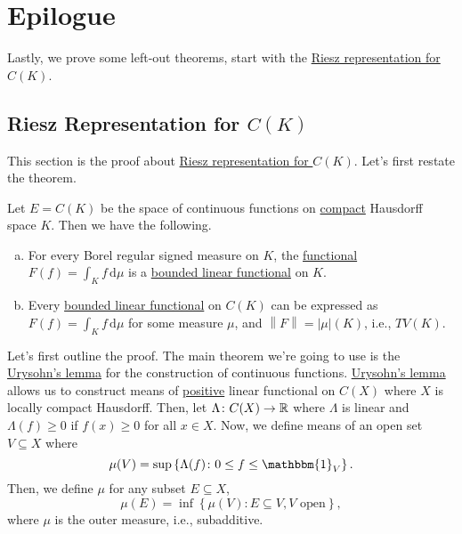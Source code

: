 \chapter{Epilogue}
Lastly, we prove some left-out theorems, start with the \hyperref[thm:Riesz-representation-for-C-K]{Riesz representation for \(C(K)\)}.

\section{Riesz Representation for \(C(K)\)}\label{pf:Riesz-representation-for-C-K}
This section is the proof about \hyperref[thm:Riesz-representation-for-C-K]{Riesz representation for \(C(K)\)}. Let's first restate the theorem.

\begin{prev}
	Let \(E = C(K)\) be the space of continuous functions on \hyperref[def:compact]{compact} Hausdorff space \(K\). Then we have the following.
	\begin{enumerate}[(a)]
		\item For every Borel regular signed measure on \(K\), the \hyperref[def:linear-functional]{functional} \(F(f) = \int _K f\,\mathrm{d} \mu \) is a \hyperref[def:bounded-linear-functional]{bounded linear functional} on \(K\).
		\item Every \hyperref[def:bounded-linear-functional]{bounded linear functional} on \(C(K)\) can be expressed as \(F(f) = \int _K f\,\mathrm{d} \mu \) for some measure \(\mu \), and \(\left\lVert F\right\rVert = \left\vert \mu  \right\vert (K) \), i.e., \(TV(K)\).
	\end{enumerate}
\end{prev}
Let's first outline the proof. The main theorem we're going to use is the \hyperref[thm:Urysohn-lemma]{Urysohn's lemma} for the construction of continuous functions. \hyperref[thm:Urysohn-lemma]{Urysohn's lemma} allows us to construct means of \hyperref[def:positive-op]{positive} linear functional on \(C(X)\) where \(X\) is locally compact Hausdorff. Then, let \(\Lambda \colon C(X) \to \mathbb{\MakeUppercase{r}} \) where \(\Lambda \) is linear and \(\Lambda (f) \geq 0\) if \(f(x) \geq 0\) for all \(x\in X\). Now, we define means of an open set \(V \subseteq X\) where
\[
	\mu (V) = \sup \left\{ \Lambda (f) \colon 0 \leq f \leq \mathbbm{1}_{V} \right\}.
\]
Then, we define \(\mu \) for any subset \(E \subseteq X\),
\[
	\mu (E) = \inf \left\{ \mu (V)\colon E \subseteq V, V \text{ open}  \right\},
\]
where \(\mu \) is the outer measure, i.e., subadditive.